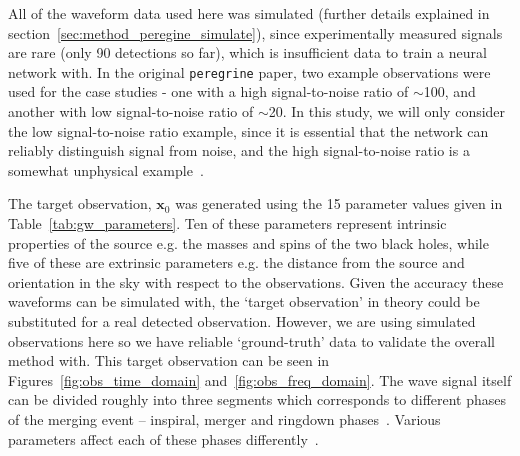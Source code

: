 All of the waveform data used here was simulated (further details explained in section~\ref{sec:method_peregine_simulate}), since experimentally measured signals are rare (only 90 detections so far), which is insufficient data to train a neural network with. In the original \texttt{peregrine} paper, two example observations were used for the case studies - one with a high signal-to-noise ratio of $\sim$100, and another with low signal-to-noise ratio of $\sim$20. In this study, we will only consider the low signal-to-noise ratio example, since it is essential that the network can reliably distinguish signal from noise, and the high signal-to-noise ratio is a somewhat unphysical example~\cite{bhardwaj2023peregrine}.

The target observation, $\boldsymbol{x}_0$ was generated using the 15 parameter values given in Table~\ref{tab:gw_parameters}. Ten of these parameters represent intrinsic properties of the source e.g. the masses and spins of the two black holes, while five of these are extrinsic parameters e.g. the distance from the source and orientation in the sky with respect to the observations. Given the accuracy these waveforms can be simulated with, the `target observation' in theory could be substituted for a real detected observation. However, we are using simulated observations here so we have reliable `ground-truth' data to validate the overall method with. This target observation can be seen in Figures~\ref{fig:obs_time_domain} and~\ref{fig:obs_freq_domain}. The wave signal itself can be divided roughly into three segments which corresponds to different phases of the merging event -- inspiral, merger and ringdown phases~\cite{Pan_GW_2014}. Various parameters affect each of these phases differently~\cite{bhardwaj2023peregrine}.


